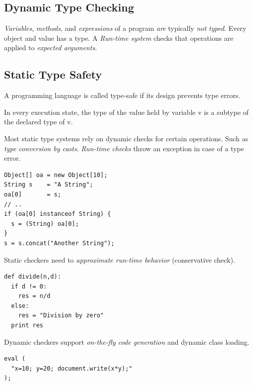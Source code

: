 \subsection{Dynamic Type Checking}
\emph{Variables}, \emph{methods}, and \emph{expressions} of a program \emph{are} typically \emph{not typed}. Every object and value has a type. A \emph{Run-time system} checks that operations are applied to \emph{expected arguments}.

\subsection{Static Type Safety}
\begin{definition}
 A programming language is called type-safe if its design prevents type errors. 
\end{definition}
\begin{shadequote}
 In every execution state, the type of the value held by variable v is a subtype of the declared type of v.
\end{shadequote}
Most static type systems rely on dynamic checks for certain operations. Such as \emph{type conversion by casts}. \emph{Run-time checks} throw an exception in case of a type error.

\begin{lstlisting}[caption=Java example on a dynamic check]
Object[] oa = new Object[10];
String s    = "A String";
oa[0]       = s;
// ..
if (oa[0] instanceof String) {
  s = (String) oa[0];
}
s = s.concat("Another String");
\end{lstlisting}

Static checkers need to \emph{approximate run-time behavior} (conservative check). 
\lstset{language=Python}
\begin{lstlisting}[caption=Python example on dynamic type checking]
def divide(n,d):
  if d != 0:
    res = n/d
  else:
    res = "Division by zero"
  print res
\end{lstlisting}

Dynamic checkers support \emph{on-the-fly code generation} and dynamic class loading.
\lstset{language=Java}
\begin{lstlisting}[caption=JavaScript example on on-the-fly code generation]
eval (
  "x=10; y=20; document.write(x*y);"
);
\end{lstlisting}

